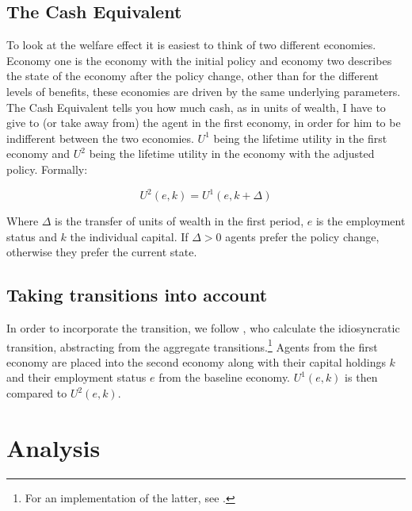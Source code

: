 \documentclass[a4paper,11pt]{article}
\begin{document}
\subsection{The Cash Equivalent}

To look at the welfare effect it is easiest to think of two different economies. Economy one is the economy with the initial policy and economy two describes the state of the economy after the policy change, other than for the different levels of benefits, these economies are driven by the same underlying parameters.\\
The Cash Equivalent tells you how much cash, as in units of wealth, I have to give to (or take away from) the agent in the first economy, in order for him to be indifferent between the two economies. $U^{1}$ being the lifetime utility in the first economy and $U^{2}$ being the lifetime utility in the economy with the adjusted policy. Formally: 

  \begin{equation}
  U^{2}(e,k) = U^{1}(e,k+\Delta) \nonumber
  \end{equation}

Where $\Delta$ is the transfer of units of wealth in the first period, $e$ is the employment status and $k$ the individual capital. If $ \Delta>0 $ agents prefer the policy change, otherwise they prefer the current state. 

\subsection{Taking transitions into account}

In order to incorporate the transition, we follow \cite{KrusellMukoyamaSahin}, who calculate the idiosyncratic transition, abstracting from the aggregate transitions.\footnote{For an implementation of the latter, see \citep{mukoyama}.} Agents from the first economy are placed into the second economy along with their capital holdings $k$ and their employment status $e$ from the baseline economy. $U^{1}(e,k)$ is then compared to $U^{2}(e,k)$.

\section{Analysis}
\end{document}
